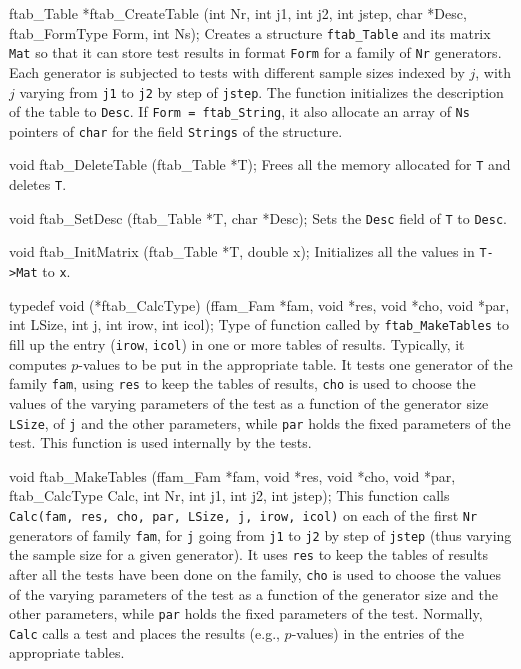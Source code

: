 \code

ftab_Table *ftab_CreateTable (int Nr, int j1, int j2, int jstep,
                              char *Desc, ftab_FormType Form, int Ns);
\endcode
\tab
  Creates a structure {\tt ftab\_Table} and its matrix {\tt Mat} so that
  it can store test results in format {\tt Form} for a family of {\tt Nr}
  generators. Each generator is subjected to tests with different sample sizes
  indexed by $j$, with $j$  varying from {\tt j1} to {\tt j2} by step of
  {\tt jstep}. The function initializes the description of the table to
  {\tt Desc}. If {\tt Form = ftab\_String}, it also allocate an array of
  {\tt Ns} pointers of  {\tt char} for the field  {\tt Strings} of the
  structure.
\endtab
\code


void ftab_DeleteTable (ftab_Table *T);
\endcode
\tab
   Frees all the memory allocated for {\tt T} and deletes {\tt T}.
\endtab
\code


void ftab_SetDesc (ftab_Table *T, char *Desc);
\endcode
 \tab
 Sets the {\tt Desc} field of {\tt T} to {\tt Desc}.
\endtab
\code


void ftab_InitMatrix (ftab_Table *T, double x);
\endcode
\tab
  Initializes all the values in {\tt T->Mat} to {\tt x}.
\endtab
\code


typedef void (*ftab_CalcType) (ffam_Fam *fam, void *res, void *cho,
                               void *par, int LSize, int j,
                               int irow, int icol);
\endcode 
 \tab  Type of function called by {\tt ftab\_MakeTables} to fill up
  the entry ({\tt irow}, {\tt icol}) in one or more tables of results.
  Typically, it computes $p$-values to be put in the appropriate table.
  It tests one generator of the family {\tt fam}, using {\tt res} to keep
  the tables of results, {\tt cho} is used to choose the values of the
  varying parameters of the test as a function of the generator size
  {\tt LSize}, of {\tt j} and the other parameters, while {\tt par} holds
  the fixed parameters of the test.
  This function is used internally by the tests.
\endtab
\code


void ftab_MakeTables (ffam_Fam *fam, void *res, void *cho, void *par,
                      ftab_CalcType Calc, 
                      int Nr, int j1, int j2, int jstep);
\endcode
\tab This function calls {\tt Calc(fam, res, cho, par, LSize, j, irow, icol)}
  on each of the first {\tt Nr} generators of family {\tt fam}, for
  {\tt j} going from {\tt j1} to {\tt j2} by step of {\tt jstep} (thus varying
  the sample size for a given generator). 
  It uses {\tt res} to keep the tables of results after all the tests have
  been done on the family,  {\tt cho} is used to choose the values of the
  varying parameters of the test as a function of the generator size and
  the other parameters, while {\tt par} holds the fixed parameters of the
  test. Normally, {\tt Calc} calls a test and places the results
  (e.g., $p$-values) in the entries of the appropriate tables.
\endtab



